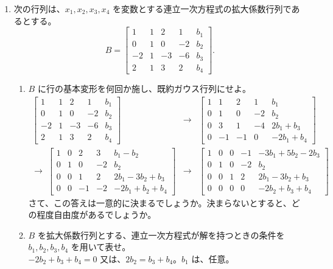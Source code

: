 \begin{enumerate}
\item 次の行列は、$x_1, x_2, x_3, x_4$ を変数とする連立一次方程式の拡大係数行列であるとする。
$$B = \left[\begin{array}{ccccc}
1 & 1 & 2 & 1 & b_1\\
0 & 1 & 0 & -2 & b_2\\
-2 & 1 & -3 & -6 & b_3\\
2 & 1 & 3 & 2 & b_4
\end{array}\right].$$
\begin{enumerate}
\item $B$ に行の基本変形を何回か施し、既約ガウス行列にせよ。\\
\sol
\begin{eqnarray*}
\left[\begin{array}{ccccc}
1 & 1 & 2 & 1 & b_1\\
0 & 1 & 0 & -2 & b_2\\
-2 & 1 & -3 & -6 & b_3\\
2 & 1 & 3 & 2 & b_4
\end{array}\right] & \to & 
\left[\begin{array}{ccccc}
1 & 1 & 2 & 1 & b_1\\
0 & 1 & 0 & -2 & b_2\\
0 & 3 & 1 & -4 & 2b_1+b_3\\
0 & -1 & -1 & 0 & -2b_1+b_4
\end{array}\right]\\
\to \; \left[\begin{array}{ccccc}
1 & 0 & 2 & 3 & b_1-b_2\\
0 & 1 & 0 & -2 & b_2\\
0 & 0 & 1 & 2 & 2b_1-3b_2+b_3\\
0 & 0 & -1 & -2 & -2b_1+b_2 +b_4
\end{array}\right] 
& \to &
\left[\begin{array}{ccccc}
1 & 0 & 0 & -1 & -3b_1+ 5b_2 - 2b_3\\
0 & 1 & 0 & -2 & b_2\\
0 & 0 & 1 & 2 & 2b_1-3b_2 +b_3\\
0 & 0 & 0 & 0 & -2b_2+b_3 +b_4
\end{array}\right] 
\end{eqnarray*}
さて、この答えは一意的に決まるでしょうか。決まらないとすると、どの程度自由度があるでしょうか。

\item $B$ を拡大係数行列とする、連立一次方程式が解を持つときの条件を $b_1, b_2, b_3, b_4$ を用いて表せ。\\
\sol
$-2b_2 + b_3 + b_4 = 0$ 又は、$2b_2 = b_3 + b_4$。$b_1$ は、任意。
\end{enumerate}


\end{enumerate}
